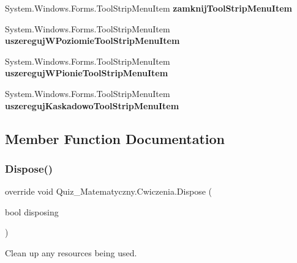 \begin{DoxyCompactItemize}
\mbox{\label{class_quiz___matematyczny_1_1_cwiczenia_a6641ea034ccfa004abcc601b689585ad}} 
System.\+Windows.\+Forms.\+Tool\+Strip\+Menu\+Item {\bfseries zamknij\+Tool\+Strip\+Menu\+Item}
\item 
\mbox{\label{class_quiz___matematyczny_1_1_cwiczenia_a6132396b5d14584bee7677a916fb2810}} 
System.\+Windows.\+Forms.\+Tool\+Strip\+Menu\+Item {\bfseries uszereguj\+W\+Poziomie\+Tool\+Strip\+Menu\+Item}
\item 
\mbox{\label{class_quiz___matematyczny_1_1_cwiczenia_abe9a3631458f4edc91e8d29357d05647}} 
System.\+Windows.\+Forms.\+Tool\+Strip\+Menu\+Item {\bfseries uszereguj\+W\+Pionie\+Tool\+Strip\+Menu\+Item}
\item 
\mbox{\label{class_quiz___matematyczny_1_1_cwiczenia_a65921124dfe175358bef80793275dccf}} 
System.\+Windows.\+Forms.\+Tool\+Strip\+Menu\+Item {\bfseries uszereguj\+Kaskadowo\+Tool\+Strip\+Menu\+Item}
\end{DoxyCompactItemize}


\subsection{Member Function Documentation}
\mbox{\label{class_quiz___matematyczny_1_1_cwiczenia_a243ec50b38a642ad320a8aa0a1758303}} 
\subsubsection{\texorpdfstring{Dispose()}{Dispose()}}
{\footnotesize\ttfamily override void Quiz\+\_\+\+Matematyczny.\+Cwiczenia.\+Dispose (\begin{DoxyParamCaption}\item[{bool}]{disposing }\end{DoxyParamCaption})\hspace{0.3cm}{\ttfamily [protected]}}



Clean up any resources being used. 


